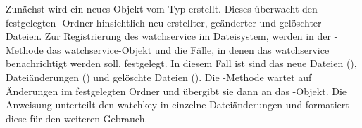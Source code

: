 Zunächst wird ein neues Objekt vom Typ  erstellt. Dieses überwacht den festgelegten \sblit-Ordner hinsichtlich neu erstellter, geänderter und gelöschter Dateien. Zur Registrierung des \gls{watchservice} im Dateisystem, werden in der -Methode das \gls{watchservice}-Objekt und die Fälle, in denen das \gls{watchservice} benachrichtigt werden soll, festgelegt. In diesem Fall ist sind das neue Dateien (), Dateiänderungen () und gelöschte Dateien (). Die -Methode wartet auf Änderungen im festgelegten Ordner und übergibt sie dann an das -Objekt. Die Anweisung  unterteilt den \gls{watchkey} in einzelne Dateiänderungen und formatiert diese für den weiteren Gebrauch. 

